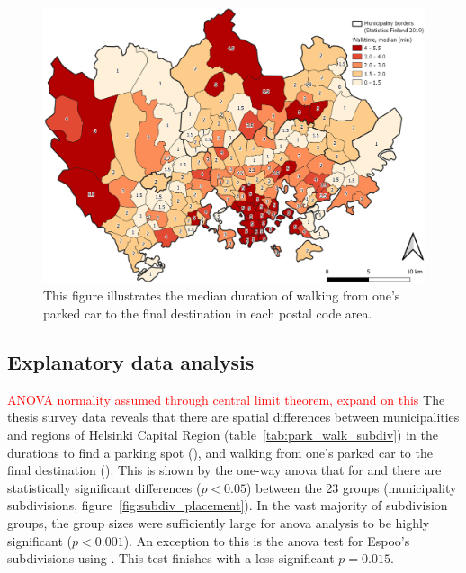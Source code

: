 \begin{figure}[H]%
    \centering
    \includegraphics[width=\textwidth]{images/thesis_postalvis_walkmedian.png}
    \caption[Walktime, median, in the research area]{This figure illustrates the median duration of walking from one's parked car to the final destination in each postal code area.}%
    \label{fig:postalvis_walkmedian}%
\end{figure}

\newpage
\subsection{Explanatory data analysis}
\justify


\textcolor{red}{ANOVA normality assumed through central limit theorem, expand on this}
The thesis survey data reveals that there are spatial differences between municipalities and regions of Helsinki Capital Region (table~\ref{tab:park_walk_subdiv}) in the durations to find a parking spot (), and walking from one's parked car to the final destination (). This is shown by the one-way \acrfull{anova} that for  and  there are statistically significant differences ($p < 0.05$) between the 23 groups (municipality subdivisions, figure~\ref{fig:subdiv_placement}). In the vast majority of subdivision groups, the group sizes were sufficiently large for \acrshort{anova} analysis to be highly significant ($p < 0.001$). An exception to this is the \acrshort{anova} test for Espoo's subdivisions using . This test finishes with a less significant $p = 0.015$.

